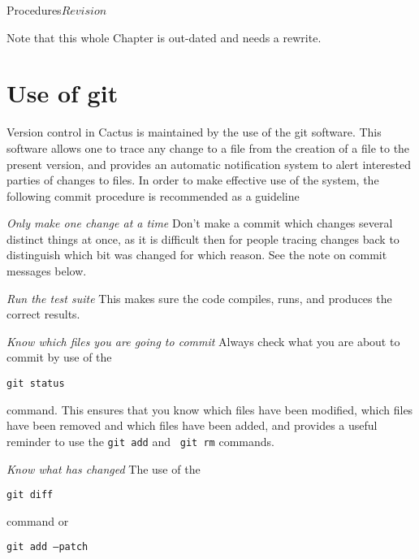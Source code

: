 
\begin{cactuspart}{2}{Procedures}{}{$Revision$}
\renewcommand{\thepage}{\Alph{part}\arabic{page}}

Note that this whole Chapter is out-dated and needs a rewrite.


\chapter{Use of git}

Version control in Cactus is maintained by the use of the git
software.  This software allows one to trace any change to a file from 
the creation of a file to the present version, and provides an
automatic notification system to alert interested parties of changes
to files.  In order to make effective use of the system, the following 
commit procedure is recommended as a guideline

\begin{Lentry}
\item[{\em Only make one change at a time}]
Don't make a commit which changes several distinct things at once, as
it is difficult then for people tracing changes back to distinguish
which bit was changed for which reason.  See the note on commit
messages below.
\item[{\em Run the test suite}]
This makes sure the code compiles, runs, and produces the correct results. 
\item[{\em Know which files you are going to commit}]
Always check what you are about to commit by use of the

{\tt git status}

command.  This ensures that you know which files have been modified,
which files have been removed and which files have been added, and
provides a useful reminder to use the {\tt \verb.git add.} and {\tt
\verb.git rm.} commands.
\item[{\em Know what has changed}]
The use of the

{\tt git diff}

command or

{\tt git add --patch}


\end{Lentry}
\end{cactuspart}
